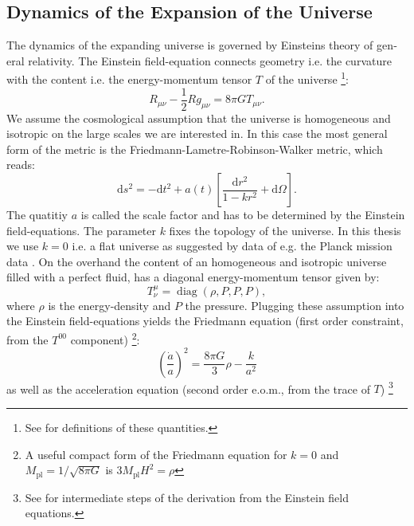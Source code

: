 \documentclass[master,       %
               twoside,        %
               BCOR10mm,       %
               english,ngerman, %
               ]{GAUBM}
\begin{document}
\begin{otherlanguage}{english}
\subsection{Dynamics of the Expansion of the Universe}
\label{sec:dynamics_of_the_examsion_of_the_universe}
The dynamics of the expanding universe is governed by Einsteins theory of general relativity. The Einstein field-equation connects geometry i.e. the curvature with the content i.e. the energy-momentum tensor $T$ of the universe \footnote{
See \cite{carroll_spacetime_and_geometry_2019} for definitions of these quantities.
}:
\begin{equation}
	R_{\mu \nu} - \frac{1}{2} R g_{\mu \nu} = 8 \pi G T_{\mu \nu}.
\end{equation}
We assume the cosmological assumption that the universe is homogeneous and isotropic on the large scales we are interested in. In this case the most general form of the metric is the Friedmann-Lametre-Robinson-Walker metric, which reads:
\begin{equation}
	\mathrm{d} s^2 = - \mathrm{d} t^2 + a(t) \left[ \frac{\mathrm{d} r^2}{1 - kr^2} + \mathrm{d} \Omega \right].
\end{equation}
The quatitiy $a$ is called the scale factor and has to be determined by the Einstein field-equations.
The parameter $k$ fixes the topology of the universe. In this thesis we use $k = 0$ i.e. a flat universe as suggested by data of e.g. the Planck mission data \cite{planck2018}.
On the overhand the content of an homogeneous and isotropic universe filled with a perfect fluid, has a diagonal energy-momentum tensor given by:
\begin{equation}
	T_\nu^\mu = \operatorname{diag}(\rho, P, P, P),
\end{equation}
where $\rho$ is the energy-density and $P$ the pressure.
Plugging these assumption into the Einstein field-equations yields the Friedmann equation (first order constraint, from the $T^{00}$ component) \footnote{
A useful compact form of the Friedmann equation for $k = 0$ and $M_\mathrm{pl} = 1 / \sqrt{8 \pi G}$ is $3 M_\mathrm{pl} H^2 = \rho$
}:
\begin{equation}
	\label{eq:friedmann_equation}
	\boxed{
	\left( \frac{\dot{a}}{a} \right)^2 = \frac{8 \pi G}{3} \rho - \frac{k}{a^2}
	}
\end{equation}
as well as the acceleration equation (second order e.o.m., from the trace of $T$) \footnote{
See \cite[sec. 2.1, 3.1]{the_early_universe_kolb_and_turner} for intermediate steps of the derivation from the Einstein field equations.
}
\end{otherlanguage}
\end{document}
